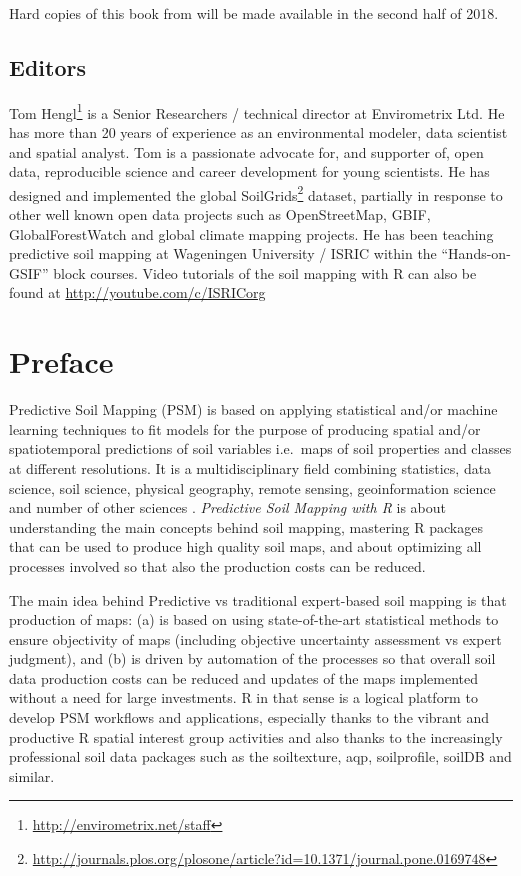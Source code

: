\documentclass[11pt]{krantz}
\renewcommand{\href}[2]{#2\footnote{\url{#1}}}
\theoremstyle{definition}
\theoremstyle{definition}
\theoremstyle{definition}
\theoremstyle{remark}
\begin{document}
Hard copies of this book from will be made available in the second half
of 2018.

\hypertarget{editors}{%
\section*{Editors}\label{editors}}


\href{http://envirometrix.net/staff}{Tom Hengl} is a Senior Researchers
/ technical director at Envirometrix Ltd. He has more than 20 years of
experience as an environmental modeler, data scientist and spatial
analyst. Tom is a passionate advocate for, and supporter of, open data,
reproducible science and career development for young scientists. He has
designed and implemented the global
\href{http://journals.plos.org/plosone/article?id=10.1371/journal.pone.0169748}{SoilGrids}
dataset, partially in response to other well known open data projects
such as OpenStreetMap, GBIF, GlobalForestWatch and global climate
mapping projects. He has been teaching predictive soil mapping at
Wageningen University / ISRIC within the ``Hands-on-GSIF'' block
courses. Video tutorials of the soil mapping with R can also be found at
\url{http://youtube.com/c/ISRICorg}

\hypertarget{preface}{%
\chapter*{Preface}\label{preface}}


Predictive Soil Mapping (PSM) is based on applying statistical and/or
machine learning techniques to fit models for the purpose of producing
spatial and/or spatiotemporal predictions of soil variables i.e.~maps of
soil properties and classes at different resolutions. It is a
multidisciplinary field combining statistics, data science, soil
science, physical geography, remote sensing, geoinformation science and
number of other sciences
\citep{Scul01, MCBRATNEY20033, Henderson2004Geoderma, Boettinger2010Springer, Zhu2015PSM}.
\emph{Predictive Soil Mapping with R} is about understanding the main
concepts behind soil mapping, mastering R packages that can be used to
produce high quality soil maps, and about optimizing all processes
involved so that also the production costs can be reduced.

The main idea behind Predictive vs traditional expert-based soil mapping
is that production of maps: (a) is based on using state-of-the-art
statistical methods to ensure objectivity of maps (including objective
uncertainty assessment vs expert judgment), and (b) is driven by
automation of the processes so that overall soil data production costs
can be reduced and updates of the maps implemented without a need for
large investments. R in that sense is a logical platform to develop PSM
workflows and applications, especially thanks to the vibrant and
productive R spatial interest group activities and also thanks to the
increasingly professional soil data packages such as the soiltexture,
aqp, soilprofile, soilDB and similar.
\end{document}
